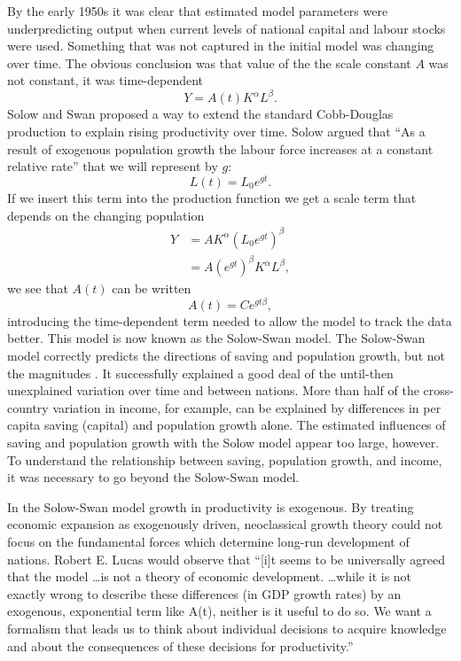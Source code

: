 By the early 1950s it was clear that estimated model parameters were underpredicting  output when  current levels of  national capital and labour stocks were used.   Something that was not captured in the initial model was changing over time. The obvious conclusion was that value of the the scale constant $A$  was not constant, it was time-dependent  
 \[Y=A(t)K^\alpha L^\beta.\]
Solow and Swan proposed a way to extend the standard \gls{Cobb-Douglas} production to explain rising productivity over time. 
Solow  argued that ``As a result of exogenous population growth the labour force increases at a constant relative rate'' that we will represent by  $g$:
  \[L(t)= L_0e^{gt}.\] 
If we insert this term into the production function we get a scale term that depends on the changing population 
\begin{eqnarray}
Y &= AK^\alpha (L_0e^{gt})^\beta\nonumber\\
  &= A(e^{gt})^{\beta}K^\alpha L^\beta,
\label{eqn-solow-swan3}
\end{eqnarray}
we see that $A(t)$ can be written
 \[A(t)=Ce^{gt\beta},\]
introducing the time-dependent term needed to allow the model to track the data better. This model is now known as the \gls{Solow-Swan model}. 
The \gls{Solow-Swan model} correctly predicts the directions of saving and population growth, but not the magnitudes \cite{mankiwContributionEmpiricsEconomic1992}. It successfully explained a good deal of the until-then unexplained variation over time and between nations. More than half  of the cross-country variation in income, for example,  can be explained by differences in per capita saving (capital) and population growth alone. The estimated influences of saving and population growth with the Solow model appear too large, however. To understand the relationship between saving, population growth, and income, it was necessary to go beyond the  Solow-Swan model.

In the Solow-Swan model growth in productivity is exogenous.
By treating economic expansion  as exogenously driven, neoclassical growth theory could not focus on the fundamental forces which determine long-run development of nations.   Robert E. Lucas \cite{lucasMechanicsEconomicDevelopment1988} would observe that ``[i]t seems to be universally agreed that the model \dots is not a theory of economic development.   \dots while it is not exactly wrong to describe these differences (in GDP  growth rates) by an exogenous, exponential term like A(t), neither is it useful to do so. We want a formalism that leads us to think about individual decisions to acquire knowledge and about the consequences of these decisions for productivity.'' 


